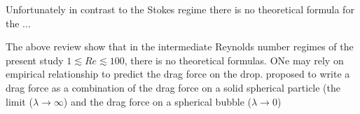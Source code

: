 


Unfortunately in contrast to the Stokes regime there is no theoretical formula for the ... 


The above review show that in the intermediate Reynolds number regimes of the present study $ 1 \lesssim Re \lesssim 100$, there is no theoretical formulas. ONe may rely on empirical relationship to predict the drag force on the drop. \citet{rivkind1970} proposed to write a drag force as a combination of the drag force on a solid spherical particle
(the limit ($\lambda \rightarrow \infty$) and the drag force on a spherical bubble ($\lambda \rightarrow 0$)

